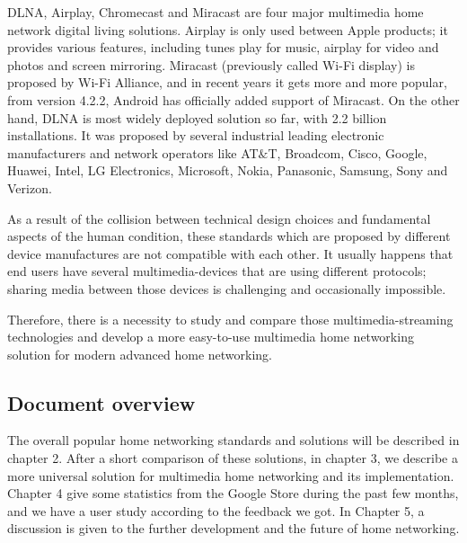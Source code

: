 DLNA, Airplay, Chromecast and Miracast are four major multimedia home network
digital living solutions. Airplay is only used between Apple products; it
provides various features, including tunes play for music, airplay for video
and photos and screen mirroring. Miracast (previously called Wi-Fi display) is
proposed by Wi-Fi Alliance, and in recent years it gets more and more popular,
from version 4.2.2, Android has officially added support of Miracast. On the
other hand, DLNA is most widely deployed solution so far, with 2.2 billion installations.
It was proposed by several industrial leading electronic manufacturers and network operators 
like AT$\&$T, Broadcom, Cisco, Google, Huawei, Intel, LG Electronics, Microsoft, Nokia, 
Panasonic, Samsung, Sony and Verizon.

As a result of the collision between technical design choices and fundamental
aspects of the human condition, these standards which are proposed by
different device manufactures are not compatible with each other. It usually happens that
end users have several multimedia-devices that are using different protocols;
sharing media between those devices is challenging and occasionally impossible. 

Therefore, there is a necessity to study and compare those multimedia-streaming
technologies and develop a more easy-to-use multimedia home networking solution
for modern advanced home networking.

\subsection{Document overview}
The overall popular home networking standards and solutions will be described in
chapter 2. After a short comparison of these solutions, in chapter 3, we
describe a more universal solution for multimedia home networking and its
implementation. Chapter 4 give some statistics from the Google Store
during the past few months, and we have a user study according to the feedback
we got. In Chapter 5, a discussion is given to the further development and the
future of home networking.
